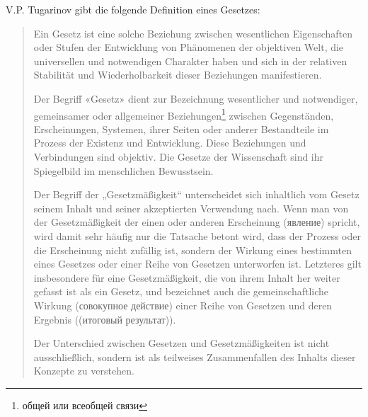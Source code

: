 \documentclass[11pt,a4paper]{article}
\begin{document}
V.P. Tugarinov gibt die folgende Definition eines Gesetzes: 
\begin{quote}
  Ein Gesetz ist eine solche Beziehung zwischen wesentlichen Eigenschaften
  oder Stufen der Entwicklung von Phänomenen der objektiven Welt, die
  universellen und notwendigen Charakter haben und sich in der relativen
  Stabilität und Wiederholbarkeit dieser Beziehungen manifestieren.

  Der Begriff «Gesetz» dient zur Bezeichnung wesentlicher und notwendiger,
  gemeinsamer oder allgemeiner
  Beziehungen\footnote{\foreignlanguage{russian}{общей или всеобщей связи}}
  zwischen Gegenständen, Erscheinungen, Systemen, ihrer Seiten oder anderer
  Bestandteile im Prozess der Existenz und Entwicklung. Diese Beziehungen und
  Verbindungen sind objektiv. Die Gesetze der Wissenschaft sind ihr
  Spiegelbild im menschlichen Bewusstsein.

  Der Begriff der „Gesetzmäßigkeit“ unterscheidet sich inhaltlich vom Gesetz
  seinem Inhalt und seiner akzeptierten Verwendung nach. Wenn man von der
  Gesetzmäßigkeit der einen oder anderen Erscheinung
  (\foreignlanguage{russian}{явление}) spricht, wird damit sehr häufig nur die
  Tatsache betont wird, dass der Prozess oder die Erscheinung nicht zufällig
  ist, sondern der Wirkung eines bestimmten eines Gesetzes oder einer Reihe
  von Gesetzen unterworfen ist. Letzteres gilt insbesondere für eine
  Gesetzmäßigkeit, die von ihrem Inhalt her weiter gefasst ist als ein Gesetz,
  und bezeichnet auch die gemeinschaftliche Wirkung
  (\foreignlanguage{russian}{совокупное действие}) einer Reihe von Gesetzen und
  deren Ergebnis ((\foreignlanguage{russian}{итоговый результат})).

  Der Unterschied zwischen Gesetzen und Gesetzmäßigkeiten ist nicht
  ausschließlich, sondern ist als teilweises Zusammenfallen des Inhalts dieser
  Konzepte zu verstehen.
\end{quote}
\end{document}
